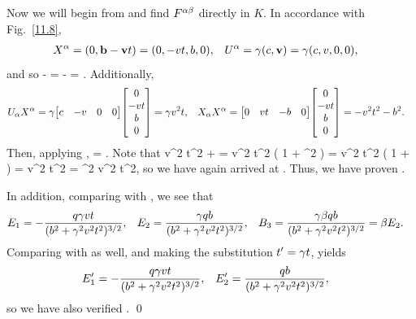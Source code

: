 \begin{solution}
	Now we will begin from  and find $F^{\alpha \beta}$ directly in $K$.  In accordance with Fig.~\ref{11.8},
	\begin{align*}
		X^\alpha &= (0, \vb{b} - \vb{v} t) = (0, -v t, b, 0), &
		U^\alpha &= \gamma (c, \vb{v}) = \gamma (c, v, 0, 0),
	\end{align*}
	and so
	\beq
		\Xa \Ub - \Xb \Ua = \gam
			\mqty[ 0 & 0 & 0 & 0 \\
				-c v t & -v^2 t & 0 & 0 \\
				c b & v b & 0 & 0 \\
				0 & 0 & 0 & 0 ]
		- \gam
			\mqty[ 0 & -c v t & c b & 0 \\
				0 & -v^2 t & v b & 0 \\
				0 & 0 & 0 & 0 \\
				0 & 0 & 0 & 0 ]
		= \gam
			\mqty[0 & c v t & - c b & 0 \\
				-c v t & 0 & -v b & 0 \\
				c b & v b & 0 & 0 \\
				0 & 0 & 0 & 0 ].
	\eeq
	Additionally,
	\begin{align*}
		\Usa \Xa &= \gam \mqty[ c & -v & 0 & 0 ] \mqty[ 0 \\ -v t \\ b \\ 0 ]
		= \gam v^2 t, &
		\Xsa \Xa &= \mqty[ 0 & vt & -b & 0 ] \mqty[ 0 \\ -v t \\ b \\ 0 ]
		= -v^2 t^2 - b^2.
	\end{align*}
	Then, applying ,
	\beq
		\Fab = 
			\mqty[0 & v t & -b & 0 \\
				-v t & 0 & -v b / c & 0 \\
				b & v b / c & 0 & 0 \\
				0 & 0 & 0 & 0 ].
	\eeq
	Note that
	\beq
		v^2 t^2 +  = v^2 t^2 \left( 1 + \gam^2  \right)
		= v^2 t^2 \left( 1 +  \right)
		= v^2 t^2 
		= \gam^2 v^2 t^2,
	\eeq
	so we have again arrived at .  Thus, we have proven .
	
	In addition, comparing  with , we see that
	\begin{align*}
		E_1 &= -\frac{q \gamma v t}{(b^2 + \gamma^2 v^2 t^2)^{3/2}}, &
		E_2 &= \frac{\gamma q b}{(b^2 + \gamma^2 v^2 t^2)^{3/2}}, &
		B_3 &= \frac{\gamma \beta q b}{(b^2 + \gamma^2 v^2 t^2)^{3/2}} = \beta E_2.
	\end{align*}
	Comparing  with  as well, and making the substitution $t' = \gamma t$, yields
	\begin{align*}
		E_1' &= -\frac{q \gamma v t}{(b^2 + \gamma^2 v^2 t^2)^{3/2}}, &
		E_2' &= \frac{q b}{(b^2 + \gamma^2 v^2 t^2)^{3/2}},
	\end{align*}
	so we have also verified . \qed
\end{solution}


